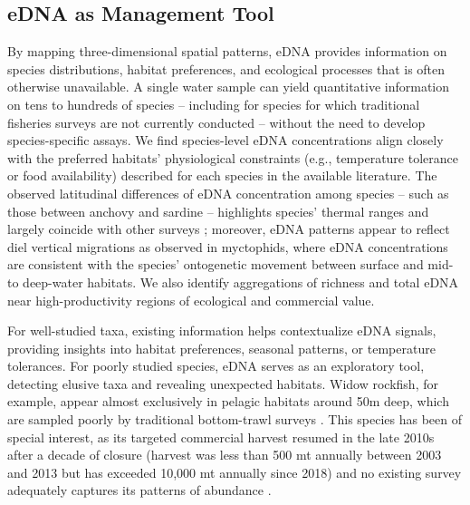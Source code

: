 \documentclass{article}
\begin{document}
\subsection*{eDNA as Management Tool}
By mapping three-dimensional spatial patterns, eDNA provides information on species distributions, habitat preferences, and ecological processes that is often otherwise unavailable. A single water sample can yield quantitative information on tens to hundreds of species -- including for species for which traditional fisheries surveys are not currently conducted -- without the need to develop species-specific assays. We find species-level eDNA concentrations align closely with the preferred habitats' physiological constraints (e.g., temperature tolerance or food availability) described for each species in the available literature. The observed latitudinal differences of eDNA concentration among species – such as those between anchovy and sardine – highlights species’ thermal ranges and largely coincide with other surveys \cite{zwolinski2024}; moreover, eDNA patterns appear to reflect diel vertical migrations as observed in myctophids, where eDNA concentrations are consistent with the species’ ontogenetic movement between surface and mid- to deep-water habitats. We also identify aggregations of richness and total eDNA near high-productivity regions of ecological and commercial value. 


For well-studied taxa, existing information helps contextualize eDNA signals, providing insights into habitat preferences, seasonal patterns, or temperature tolerances. For poorly studied species, eDNA serves as an exploratory tool, detecting elusive taxa and revealing unexpected habitats. Widow rockfish, for example, appear almost exclusively in pelagic habitats around 50m deep, which are sampled poorly by traditional bottom-trawl surveys \cite{keller2017}. This species has been of special interest, as its targeted commercial harvest resumed in the late 2010s after a decade of closure (harvest was less than 500 mt annually between 2003 and 2013 but has exceeded 10,000 mt annually since 2018) and no existing survey adequately captures its patterns of abundance \cite{adams2019a}.
\end{document}
